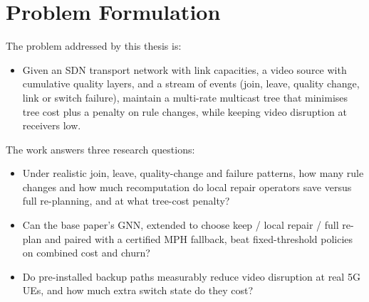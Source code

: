 \section{Problem Formulation}\label{sec:lr_rq}
\noindent The problem addressed by this thesis is:
\begin{itemize}
    \item Given an SDN transport network with link capacities, a video source with cumulative quality layers, and a stream of events (join, leave, quality change, link or switch failure), maintain a multi-rate multicast tree that minimises tree cost plus a penalty on rule changes, while keeping video disruption at receivers low.
\end{itemize}
\noindent The work answers three research questions:
\begin{itemize}
    \item Under realistic join, leave, quality-change and failure patterns, how many rule changes and how much recomputation do local repair operators save versus full re-planning, and at what tree-cost penalty?
    \item Can the base paper's GNN, extended to choose keep / local repair / full re-plan and paired with a certified MPH fallback, beat fixed-threshold policies on combined cost and churn?
    \item Do pre-installed backup paths measurably reduce video disruption at real 5G UEs, and how much extra switch state do they cost?
\end{itemize}
